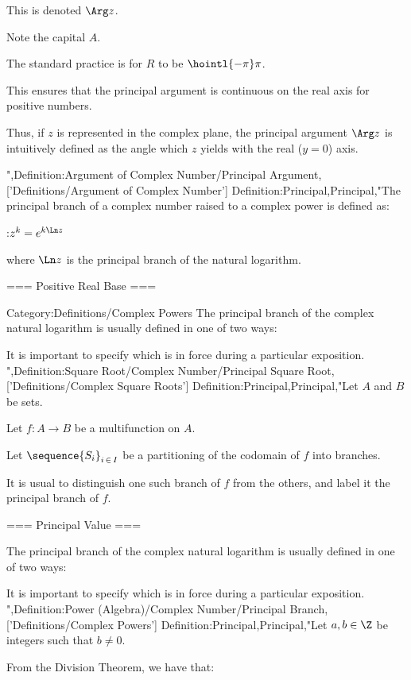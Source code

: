 This is denoted $\Arg z$.

Note the capital $A$.

The standard practice is for $R$ to be $\hointl {-\pi} \pi$.

This ensures that the principal argument is continuous on the real axis for positive numbers.

Thus, if $z$ is represented in the complex plane, the principal argument $\Arg z$ is intuitively defined as the angle which $z$ yields with the real ($y = 0$) axis.



",Definition:Argument of Complex Number/Principal Argument,['Definitions/Argument of Complex Number']
Definition:Principal,Principal,"The principal branch of a complex number raised to a complex power is defined as:

:$z^k = e^{k \Ln z}$

where $\Ln z$ is the principal branch of the natural logarithm.


=== Positive Real Base ===


Category:Definitions/Complex Powers
The principal branch of the complex natural logarithm is usually defined in one of two ways:






It is important to specify which is in force during a particular exposition.
",Definition:Square Root/Complex Number/Principal Square Root,['Definitions/Complex Square Roots']
Definition:Principal,Principal,"Let $A$ and $B$ be sets.

Let $f: A \to B$ be a multifunction on $A$.

Let $\sequence {S_i}_{i \mathop \in I}$ be a partitioning of the codomain of $f$ into branches.


It is usual to distinguish one such branch of $f$ from the others, and label it the principal branch of $f$.


=== Principal Value ===

The principal branch of the complex natural logarithm is usually defined in one of two ways:






It is important to specify which is in force during a particular exposition.
",Definition:Power (Algebra)/Complex Number/Principal Branch,['Definitions/Complex Powers']
Definition:Principal,Principal,"Let $a, b \in \Z$ be integers such that $b \ne 0$.

From the Division Theorem, we have that:

